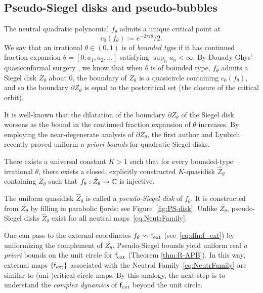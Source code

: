 \documentclass{amsart}
\begin{document}
\subsection{Pseudo-Siegel disks and pseudo-bubbles}

The neutral quadratic polynomial $f_\theta$ admits a unique critical point at 
\[
c_0(f_\theta) := e^{-2\pi i \theta}/2.
\]
We say that an irrational $\theta \in (0,1)$ is of \emph{bounded type} if it has continued fraction expansion $\theta = [0;a_1,a_2,\ldots]$ satisfying $\sup_n a_n < \infty$.
By Douady-Ghys' quasiconformal surgery \cite{D87,G84}, we know that when $\theta$ is of bounded type, $f_\theta$ admits a Siegel disk $Z_\theta$ about $0$, the boundary of $Z_\theta$ is a quasicircle containing $c_0(f_\theta)$, and so the boundary $\partial Z_\theta$ is equal to the postcritical set (the closure of the critical orbit).

It is well-known that the dilatation of the boundary $\partial Z_\theta$ of the Siegel disk worsens as the bound in the continued fraction expansion of $\theta$ increases. 
By employing the near-degenerate analysis of $\partial Z_\theta$, the first author and Lyubich \cite{DL22} recently proved uniform \emph{a priori bounds} for quadratic Siegel disks.

\begin{theorem}
\label{thm:pseudo-siegel-bounds}
    There exists a universal constant $K>1$ such that for every bounded-type irrational $\theta$, there exists a closed, explicitly constructed $K$-quasidisk $\hat{Z}_\theta$ containing $Z_\theta$ such that $f_\theta :\hat{Z}_\theta \to \mathbb{C}$ is injective. 
\end{theorem}

The uniform quasidisk $\hat{Z}_\theta$ is called a \emph{pseudo-Siegel disk} of $f_\theta$. 
It is constructed from $\overline{Z_\theta}$ by filling in parabolic fjords; see Figure~\ref{fig:PS-disk}.
Unlike $\overline{Z_\theta}$, pseudo-Siegel disks $\hat{Z}_\theta$ exist for all neutral maps~\eqref{eq:NeutrFamily}. 

One can pass to the external coordinates $f_\theta \leadsto \mathsf{f}_{\textnormal{ext}}$ (see~\eqref{eq:dfn:f_ext}) by uniformizing the complement of $\overline{Z_\theta}$.
Pseudo-Siegel bounds yield uniform real \emph{a priori} bounds on the unit circle for $\mathsf{f}_{\textnormal{ext}}$ (Theorem \ref{thm:R-APB}). 
In this way, external maps $\{\mathsf{f}_{\textnormal{ext}}\}$ associated with the Neutral Family~\eqref{eq:NeutrFamily} are similar to (uni-)critical circle maps. 
By this analogy, the next step is to understand the \emph{complex dynamics} of $\mathsf{f}_{\textnormal{ext}}$ beyond the unit circle.
\end{document}

